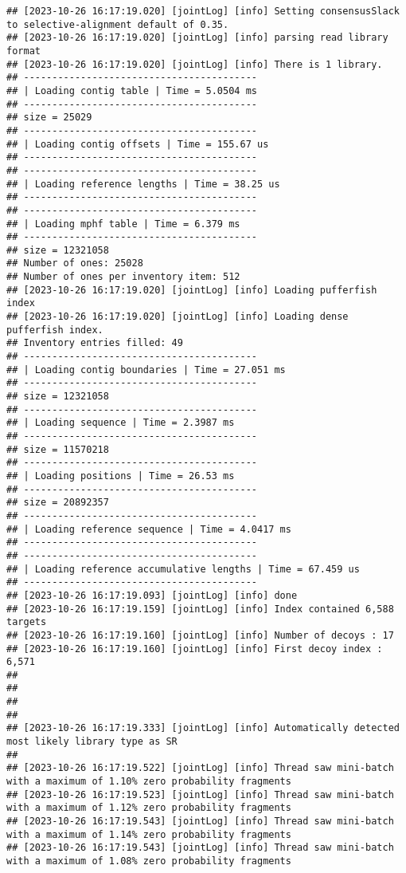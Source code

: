 \documentclass[
]{book}
\begin{document}
\begin{verbatim}
## [2023-10-26 16:17:19.020] [jointLog] [info] Setting consensusSlack to selective-alignment default of 0.35.
## [2023-10-26 16:17:19.020] [jointLog] [info] parsing read library format
## [2023-10-26 16:17:19.020] [jointLog] [info] There is 1 library.
## -----------------------------------------
## | Loading contig table | Time = 5.0504 ms
## -----------------------------------------
## size = 25029
## -----------------------------------------
## | Loading contig offsets | Time = 155.67 us
## -----------------------------------------
## -----------------------------------------
## | Loading reference lengths | Time = 38.25 us
## -----------------------------------------
## -----------------------------------------
## | Loading mphf table | Time = 6.379 ms
## -----------------------------------------
## size = 12321058
## Number of ones: 25028
## Number of ones per inventory item: 512
## [2023-10-26 16:17:19.020] [jointLog] [info] Loading pufferfish index
## [2023-10-26 16:17:19.020] [jointLog] [info] Loading dense pufferfish index.
## Inventory entries filled: 49
## -----------------------------------------
## | Loading contig boundaries | Time = 27.051 ms
## -----------------------------------------
## size = 12321058
## -----------------------------------------
## | Loading sequence | Time = 2.3987 ms
## -----------------------------------------
## size = 11570218
## -----------------------------------------
## | Loading positions | Time = 26.53 ms
## -----------------------------------------
## size = 20892357
## -----------------------------------------
## | Loading reference sequence | Time = 4.0417 ms
## -----------------------------------------
## -----------------------------------------
## | Loading reference accumulative lengths | Time = 67.459 us
## -----------------------------------------
## [2023-10-26 16:17:19.093] [jointLog] [info] done
## [2023-10-26 16:17:19.159] [jointLog] [info] Index contained 6,588 targets
## [2023-10-26 16:17:19.160] [jointLog] [info] Number of decoys : 17
## [2023-10-26 16:17:19.160] [jointLog] [info] First decoy index : 6,571 
## 
## 
## 
## 
## [2023-10-26 16:17:19.333] [jointLog] [info] Automatically detected most likely library type as SR
## 
## [2023-10-26 16:17:19.522] [jointLog] [info] Thread saw mini-batch with a maximum of 1.10% zero probability fragments
## [2023-10-26 16:17:19.523] [jointLog] [info] Thread saw mini-batch with a maximum of 1.12% zero probability fragments
## [2023-10-26 16:17:19.543] [jointLog] [info] Thread saw mini-batch with a maximum of 1.14% zero probability fragments
## [2023-10-26 16:17:19.543] [jointLog] [info] Thread saw mini-batch with a maximum of 1.08% zero probability fragments

\end{verbatim}
\end{document}
